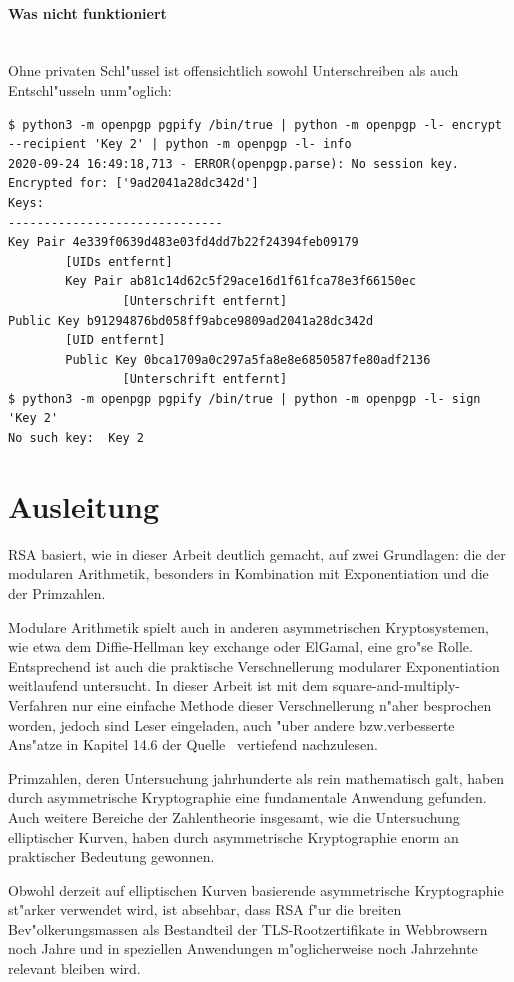 \documentclass[12pt]{article}
\begin{document}
\paragraph{Was nicht funktioniert}~\\
Ohne privaten Schl"ussel ist offensichtlich sowohl Unterschreiben als auch Entschl"usseln unm"oglich:
\begin{lstlisting}
$ python3 -m openpgp pgpify /bin/true | python -m openpgp -l- encrypt --recipient 'Key 2' | python -m openpgp -l- info
2020-09-24 16:49:18,713 - ERROR(openpgp.parse): No session key. Encrypted for: ['9ad2041a28dc342d']
Keys:
------------------------------
Key Pair 4e339f0639d483e03fd4dd7b22f24394feb09179
        [UIDs entfernt]
        Key Pair ab81c14d62c5f29ace16d1f61fca78e3f66150ec
                [Unterschrift entfernt]
Public Key b91294876bd058ff9abce9809ad2041a28dc342d
        [UID entfernt]
        Public Key 0bca1709a0c297a5fa8e8e6850587fe80adf2136
                [Unterschrift entfernt]
$ python3 -m openpgp pgpify /bin/true | python -m openpgp -l- sign 'Key 2'
No such key:  Key 2
\end{lstlisting}

\section{Ausleitung}

RSA basiert, wie in dieser Arbeit deutlich gemacht, auf zwei Grundlagen:
die der modularen Arithmetik, besonders in Kombination mit Exponentiation
und die der Primzahlen.

Modulare Arithmetik spielt auch in anderen asymmetrischen Kryptosystemen,
wie etwa dem Diffie-Hellman key exchange oder ElGamal, eine gro"se Rolle.
Ent\-sprech\-end ist auch die praktische Verschnellerung modularer Exponentiation
weitlaufend untersucht.
In dieser Arbeit ist mit dem square-and-multiply-Verfahren nur eine einfache Methode dieser Verschnellerung n"aher besprochen worden,
jedoch sind Leser eingeladen, auch "uber andere bzw.\@ verbesserte Ans"atze
in Kapitel 14.6 der Quelle~\cite{hac} vertiefend nachzulesen.

Primzahlen, deren Untersuchung jahrhunderte als rein mathematisch galt,
haben durch asymmetrische Kryptographie eine fundamentale Anwendung gefunden.
Auch weitere Bereiche der Zahlentheorie insgesamt, wie die Untersuchung elliptischer Kurven,
haben durch asymmetrische Kryptographie enorm an praktischer Bedeutung gewonnen.

Obwohl derzeit auf elliptischen Kurven
basierende asymmetrische Kryptographie st"arker verwendet wird,
ist absehbar, dass RSA f"ur die breiten Bev"olkerungsmassen als Bestandteil
der TLS-Rootzertifikate in Webbrowsern noch Jahre und in speziellen Anwendungen m"oglicherweise
noch Jahrzehnte relevant bleiben wird.
\end{document}
